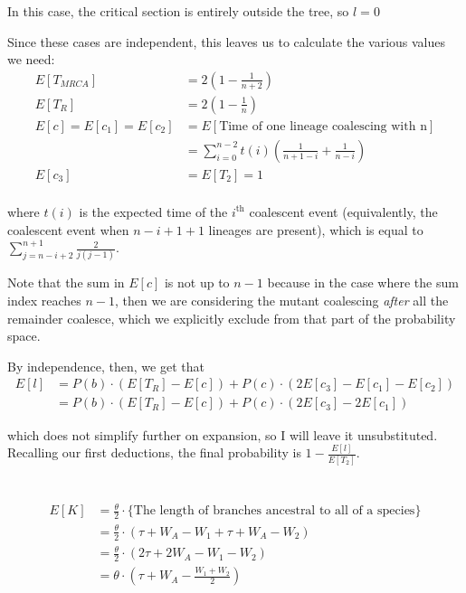 \documentclass{article}
\begin{document}
\begin{description}
In this case, the critical section is entirely outside the tree, so $l = 0$

Since these cases are independent, this leaves us to calculate the various
values we need:
\begin{align*}
E[T_{MRCA}] &= 2 ( 1 - \frac{1}{n+2}) \\
E[T_R] &= 2 ( 1 - \frac{1}{n}) \\
E[c] = E[c_1] = E[c_2] &= E[\textrm{Time of one lineage coalescing with n}] \\
                       &= \sum_{i=0}^{n-2} t(i)
                          (\frac{1}{n+1-i} + \frac{1}{n-i})\\
E[c_3] &= E[T_2] = 1 \\
\end{align*}

where $t(i)$ is the expected time of the $i^{\textrm{th}}$ coalescent event
(equivalently, the coalescent event when $n-i+1+1$ lineages are present),
which is equal to $\sum_{j=n-i+2}^{n+1} \frac{2}{j(j-1)}$.

Note that the sum in $E[c]$ is not up to $n-1$ because in the case where the sum
index reaches $n-1$, then we are considering the mutant coalescing \emph{after}
all the remainder coalesce, which we explicitly exclude from that part of the
probability space.

By independence, then, we get that
\begin{align*}
E[l] &= P(b) \cdot (E[T_R] - E[c]) + P(c) \cdot (2E[c_3] - E[c_1] - E[c_2]) \\
     &= P(b) \cdot (E[T_R] - E[c]) + P(c) \cdot (2E[c_3] - 2E[c_1])
\end{align*}

which does not simplify further on expansion, so I will leave it unsubstituted.
Recalling our first deductions, the final probability is $1 -
\frac{E[l]}{E[T_2]}$.

\end{description}

\section{}
\begin{align*}
E[K] &= \frac{\theta}{2} \cdot \{\textrm{The length of branches ancestral to
                                          all of a species}\} \\
     &= \frac{\theta}{2} \cdot (\tau + W_A - W_1 + \tau + W_A - W_2) \\
     &= \frac{\theta}{2} \cdot (2 \tau + 2 W_A - W_1 - W_2) \\
     &= \theta \cdot (\tau + W_A - \frac{W_1 + W_2}{2})
\end{align*}
\end{document}
